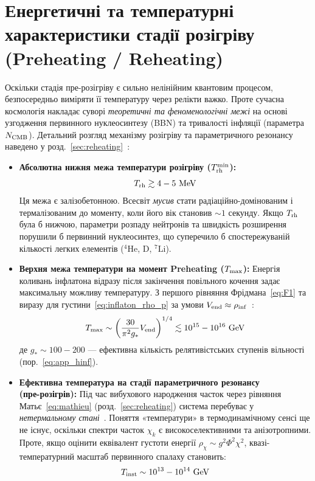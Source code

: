 \section{Енергетичні та температурні характеристики стадії розігріву (Preheating / Reheating)}

Оскільки стадія пре-розігріву є сильно нелінійним квантовим процесом, безпосередньо виміряти її температуру через релікти важко. Проте сучасна космологія накладає суворі \textit{теоретичні та феноменологічні межі} на основі узгодження первинного нуклеосинтезу (BBN) та тривалості інфляції (параметра $N_{\rm CMB}$). Детальний розгляд механізму розігріву та параметричного резонансу наведено у розд.~\ref{sec:reheating}~\cite{kofman_1994,kofman_1997}:

\begin{itemize}
    \item \textbf{Абсолютна нижня межа температури розігріву ($T_{\rm rh}^{\rm min}$):}
    \[ T_{\rm rh} \gtrsim 4-5 \text{ MeV} \]
    Ця межа є залізобетонною. Всесвіт \textit{мусив} стати радіаційно-до\-мі\-но\-ва\-ним і термалізованим до моменту, коли його вік становив $\sim 1$ секунду. Якщо $T_{\rm rh}$ була б нижчою, параметри розпаду нейтронів та швидкість розширення порушили б первинний нуклеосинтез, що суперечило б спостережуваній кількості легких елементів ($^4\text{He}$, $\text{D}$, $^7\text{Li}$).

    \item \textbf{Верхня межа температури на момент Preheating ($T_{\rm max}$):}
    Енергія коливань інфлатона відразу після закінчення повільного кочення задає максимальну можливу температуру. З першого рівняння Фрідмана~\eqref{eq:F1} та виразу для густини~\eqref{eq:inflaton_rho_p} за умови $V_{\rm end} \approx \rho_{\rm inf}$~\cite{kofman_1997}:
    \[ T_{\rm max} \sim \left( \frac{30}{\pi^2 g_*} V_{\rm end} \right)^{1/4} \lesssim 10^{15} - 10^{16} \text{ GeV} \]
    де $g_* \sim 100-200$ --- ефективна кількість релятивістських ступенів вільності (пор.~\eqref{eq:app_hinf}).

    \item \textbf{Ефективна температура на стадії параметричного резонансу\\ (пре-розігрів):}
    Під час вибухового народження часток через рівняння Матьє~\eqref{eq:mathieu} (розд.~\ref{sec:reheating}) система перебуває у \textit{нетермальному стані}~\cite{kofman_1994}. Поняття «температури» в термодинамічному сенсі ще не існує, оскільки спектри часток $\chi_k$ є високоселективними та анізотропними. Проте, якщо оцінити еквівалент густоти енергії $\rho_\chi \sim g^2 \Phi^2 \chi^2$, квазі-тем\-пе\-ра\-тур\-ний масштаб первинного спалаху становить:
    \[ T_{\rm inst} \sim 10^{13} - 10^{14} \text{ GeV} \]


\end{itemize}
